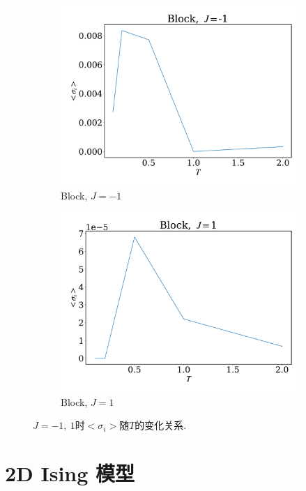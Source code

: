 \documentclass[12pt]{article}
\begin{document}
\begin{figure}
\begin{subfigure}[b]{0.49\textwidth}
		\includegraphics[width=\textwidth]{fig1DJ1N1e7/ave_bJ-1.pdf}
		\caption{Block, $J=-1$}
	\end{subfigure}
	\begin{subfigure}[b]{0.49\textwidth}
		\centering
		\includegraphics[width=\textwidth]{fig1DJ1N1e7/ave_bJ1.pdf}
		\caption{Block, $J=1$}
	\end{subfigure}
	\caption{$J=-1,\ 1$时$<\sigma_i>$随$T$的变化关系.}
	\label{fig:1Dave}
\end{figure}



\section{2D Ising 模型}
\end{document}
